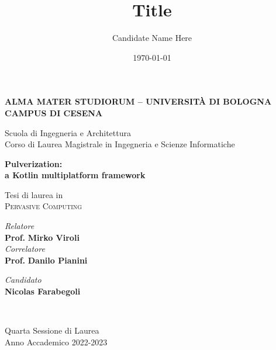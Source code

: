 \title{Title}
\author{Candidate Name Here}
\date{\today}

\begin{titlepage}
	\begin{center}

		\large
		\textbf{ALMA MATER STUDIORUM -- UNIVERSITÀ DI BOLOGNA \\ CAMPUS DI CESENA}
		\\
		\noindent\hrulefill
		\vspace{0.4cm}

		\Large
		Scuola di Ingegneria e Architettura \\
		Corso di Laurea Magistrale in Ingegneria e Scienze Informatiche

		\Huge
		\vspace{4cm}
		\textbf{
			Pulverization: \\
			a Kotlin multiplatform framework
		}

		\large
		\vspace{1cm}
		Tesi di laurea in
		\\
		\textsc{Pervasive Computing}

		\vspace{5.5cm}
		\begin{minipage}[t]{0.64\textwidth}
			\begin{flushleft}
				\textit{Relatore}
				\\
				\textbf{Prof.} \textbf{Mirko Viroli}
				\\
				\vspace{0.4cm}
				\textit{Correlatore}
				\\
				\textbf{Prof.} \textbf{Danilo Pianini}
			\end{flushleft}
		\end{minipage}
		\begin{minipage}[t]{0.34\textwidth}
			\begin{flushright}
				\textit{Candidato}
				\\
				\textbf{Nicolas Farabegoli}
			\end{flushright}
		\end{minipage}\\

		\vfill
		\noindent\hrulefill
		\vspace{0.3cm}
		\Large

		Quarta Sessione di Laurea
		\\
		Anno Accademico 2022-2023
	\end{center}
\end{titlepage}
\restoregeometry